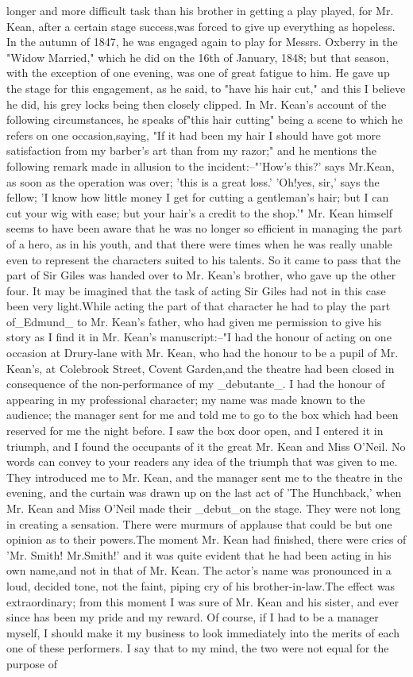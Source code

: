 \documentclass[a4paper]{article}
\begin{document}
longer and more difficult task than his brother in getting a play played, for Mr. Kean, after a certain stage success,was forced to give up everything as hopeless. In the autumn of 1847, he was engaged again to play for Messrs. Oxberry in the "Widow Married," which he did on the 16th of January, 1848; but that season, with the exception of one evening, was one of great fatigue to him. He gave up the stage for this engagement, as he said, to "have his hair cut," and this I believe he did, his grey locks being then closely clipped. In Mr. Kean's account of the following circumstances, he speaks of"this hair cutting" being a scene to which he refers on one occasion,saying, "If it had been my hair I should have got more satisfaction from my barber's art than from my razor;" and he mentions the following remark made in allusion to the incident:--"'How's this?' says Mr.Kean, as soon as the operation was over; 'this is a great loss.' 'Oh!yes, sir,' says the fellow; 'I know how little money I get for cutting a gentleman's hair; but I can cut your wig with ease; but your hair's a credit to the shop.'" Mr. Kean himself seems to have been aware that he was no longer so efficient in managing the part of a hero, as in his youth, and that there were times when he was really unable even to represent the characters suited to his talents. So it came to pass that the part of Sir Giles was handed over to Mr. Kean's brother, who gave up the other four. It may be imagined that the task of acting Sir Giles had not in this case been very light.While acting the part of that character he had to play the part of_Edmund_ to Mr. Kean's father, who had given me permission to give his story as I find it in Mr. Kean's manuscript:--"I had the honour of acting on one occasion at Drury-lane with Mr. Kean, who had the honour to be a pupil of Mr. Kean's, at Colebrook Street, Covent Garden,and the theatre had been closed in consequence of the non-performance of my _debutante_. I had the honour of appearing in my professional character; my name was made known to the audience; the manager sent for me and told me to go to the box which had been reserved for me the night before. I saw the box door open, and I entered it in triumph, and I found the occupants of it the great Mr. Kean and Miss O'Neil. No words can convey to your readers any idea of the triumph that was given to me. They introduced me to Mr. Kean, and the manager sent me to the theatre in the evening, and the curtain was drawn up on the last act of 'The Hunchback,' when Mr. Kean and Miss O'Neil made their _debut_on the stage. They were not long in creating a sensation. There were murmurs of applause that could be but one opinion as to their powers.The moment Mr. Kean had finished, there were cries of 'Mr. Smith! Mr.Smith!' and it was quite evident that he had been acting in his own name,and not in that of Mr. Kean. The actor's name was pronounced in a loud, decided tone, not the faint, piping cry of his brother-in-law.The effect was extraordinary; from this moment I was sure of Mr. Kean and his sister, and ever since has been my pride and my reward. Of course, if I had to be a manager myself, I should make it my business to look immediately into the merits of each one of these performers. I say that to my mind, the two were not equal for the purpose of 
\end{document}
